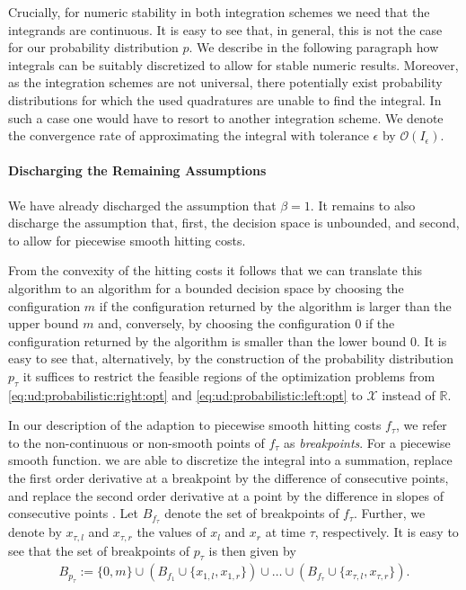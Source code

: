 Crucially, for numeric stability in both integration schemes we need that the integrands are continuous. It is easy to see that, in general, this is not the case for our probability distribution $p$. We describe in the following paragraph how integrals can be suitably discretized to allow for stable numeric results. Moreover, as the integration schemes are not universal, there potentially exist probability distributions for which the used quadratures are unable to find the integral. In such a case one would have to resort to another integration scheme. We denote the convergence rate of approximating the integral with tolerance $\epsilon$ by $\mathcal{O}(I_{\epsilon})$.

\paragraph{Discharging the Remaining Assumptions} We have already discharged the assumption that $\beta = 1$. It remains to also discharge the assumption that, first, the decision space is unbounded, and second, to allow for piecewise smooth hitting costs.

From the convexity of the hitting costs it follows that we can translate this algorithm to an algorithm for a bounded decision space by choosing the configuration $m$ if the configuration returned by the algorithm is larger than the upper bound $m$ and, conversely, by choosing the configuration $0$ if the configuration returned by the algorithm is smaller than the lower bound $0$. It is easy to see that, alternatively, by the construction of the probability distribution $p_{\tau}$ it suffices to restrict the feasible regions of the optimization problems from \autoref{eq:ud:probabilistic:right:opt} and \autoref{eq:ud:probabilistic:left:opt} to $\mathcal{X}$ instead of $\mathbb{R}$.

In our description of the adaption to piecewise smooth hitting costs $f_{\tau}$, we refer to the non-continuous or non-smooth points of $f_{\tau}$ as \emph{breakpoints}. For a piecewise smooth function. we are able to discretize the integral into a summation, replace the first order derivative at a breakpoint by the difference of consecutive points, and replace the second order derivative at a point by the difference in slopes of consecutive points \cite{Bansal2015}. Let $B_{f_{\tau}}$ denote the set of breakpoints of $f_{\tau}$. Further, we denote by $x_{\tau,l}$ and $x_{\tau,r}$ the values of $x_l$ and $x_r$ at time $\tau$, respectively. It is easy to see that the set of breakpoints of $p_{\tau}$ is then given by \begin{align*}
    B_{p_{\tau}} := \{0, m\} \cup \left(B_{f_1} \cup \{x_{1,l}, x_{1,r}\}\right) \cup \dots \cup \left(B_{f_{\tau}} \cup \{x_{\tau,l}, x_{\tau,r}\}\right).
\end{align*}

